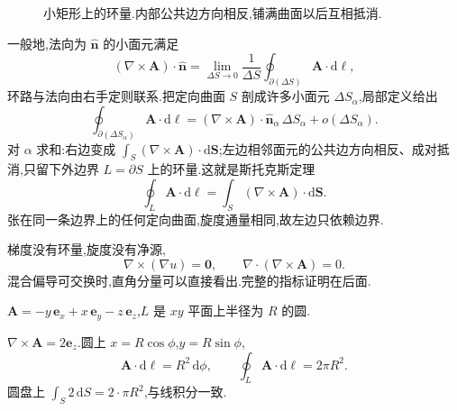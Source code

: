 \begin{figure}[htb]
  \centering
  
  \caption{小矩形上的环量.内部公共边方向相反,铺满曲面以后互相抵消.}
  \label{fig:curl-loop}
\end{figure}

一般地,法向为 $\hat{\mathbf{n}}$ 的小面元满足
\begin{equation}
  (\nabla\times\mathbf{A})\cdot\hat{\mathbf{n}}
  =\lim_{\Delta S\to 0}\frac{1}{\Delta S}
    \oint_{\partial(\Delta S)}\mathbf{A}\cdot\mathrm{d}\boldsymbol{\ell},
\end{equation}
环路与法向由右手定则联系.把定向曲面 $S$ 剖成许多小面元 $\Delta S_\alpha$,局部定义给出
\begin{equation}
  \oint_{\partial(\Delta S_\alpha)}\mathbf{A}\cdot\mathrm{d}\boldsymbol{\ell}
  =(\nabla\times\mathbf{A})\cdot\hat{\mathbf{n}}_\alpha\,\Delta S_\alpha
    +o(\Delta S_\alpha).
\end{equation}
对 $\alpha$ 求和:右边变成 $\int_S(\nabla\times\mathbf{A})\cdot\mathrm{d}\mathbf{S}$;左边相邻面元的公共边方向相反、成对抵消,只留下外边界 $L=\partial S$ 上的环量.这就是斯托克斯定理
\begin{equation}
  \oint_L\mathbf{A}\cdot\mathrm{d}\boldsymbol{\ell}
  =\int_S(\nabla\times\mathbf{A})\cdot\mathrm{d}\mathbf{S}.
  \label{eq:stokes}
\end{equation}
张在同一条边界上的任何定向曲面,旋度通量相同,故左边只依赖边界.

梯度没有环量,旋度没有净源,
\begin{equation}
  \nabla\times(\nabla u)=\mathbf{0},
  \qquad
  \nabla\cdot(\nabla\times\mathbf{A})=0.
\end{equation}
混合偏导可交换时,直角分量可以直接看出.完整的指标证明在后面.

\begin{example}
$\mathbf{A}=-y\,\mathbf{e}_x+x\,\mathbf{e}_y-z\,\mathbf{e}_z$,$L$ 是 $xy$ 平面上半径为 $R$ 的圆.
\end{example}
\begin{solution}
$\nabla\times\mathbf{A}=2\mathbf{e}_z$.圆上 $x=R\cos\phi$,$y=R\sin\phi$,
\begin{equation}
  \mathbf{A}\cdot\mathrm{d}\boldsymbol{\ell}=R^2\,\mathrm{d}\phi,
  \qquad
  \oint_L\mathbf{A}\cdot\mathrm{d}\boldsymbol{\ell}=2\pi R^2.
\end{equation}
圆盘上 $\int_S 2\,\mathrm{d}S=2\cdot\pi R^2$,与线积分一致.
\end{solution}

